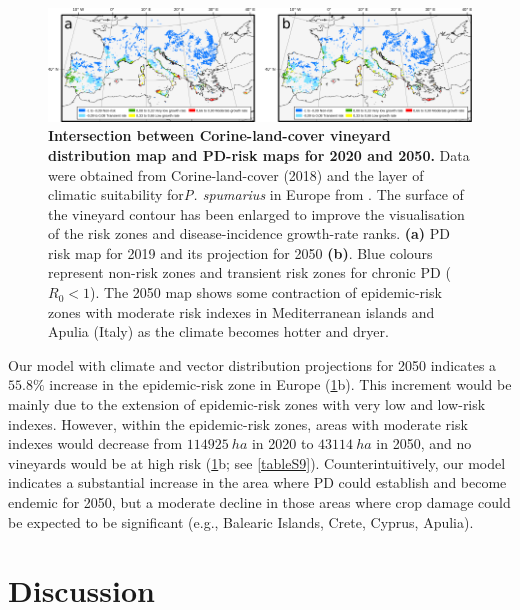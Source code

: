    \begin{figure}[H]
        \includegraphics[width=1\textwidth]{Figures/Fig6.png}
        \caption[PD risk in european vineyards for 2020 and
            2050]{\textbf{Intersection between Corine-land-cover vineyard
                distribution map and PD-risk maps for 2020 and 2050.}  Data
            were obtained from
            Corine-land-cover (2018) and the layer of climatic suitability
            for\textit{P.
                spumarius} in Europe from \cite{Godefroid2021}. The surface of
            the vineyard
            contour has been enlarged to improve the visualisation of the risk
            zones and
            disease-incidence growth-rate ranks. \textbf{(a)} PD risk map for
            2019 and its
            projection for 2050 \textbf{(b)}. Blue colours represent non-risk
            zones and
            transient risk zones for chronic PD ($R_0 < 1$). The 2050 map shows
            some
            contraction of epidemic-risk zones with moderate risk indexes in
            Mediterranean
            islands and Apulia (Italy) as the climate becomes hotter and
            dryer.}
        \label{fig6}
    \end{figure}

    Our model with climate and vector distribution projections for 2050
    indicates a $ 55.8 \% $ increase in the epidemic-risk zone in Europe
    (\cref{fig6}b). This increment would be mainly due to the extension of
    epidemic-risk zones with very low and low-risk indexes. However, within the
    epidemic-risk zones, areas with moderate risk indexes would decrease from
$\SI{114925}{ha}$ in 2020 to $\SI{43114}{ha}$ in 2050, and no vineyards would
    be at high risk (\cref{fig6}b; see \cref{tableS9}). Counterintuitively,
    our model indicates a substantial increase in the area where PD could
    establish and become endemic for 2050, but a moderate decline in those
    areas where crop damage could be expected to be significant (e.g., Balearic
    Islands, Crete, Cyprus, Apulia).

    \section{Discussion}

